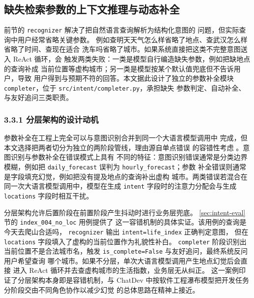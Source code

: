 ﻿%

\subsection{缺失检索参数的上下文推理与动态补全}
\label{sec:param-completion}

前节的 \texttt{recognizer} 解决了把自然语言查询解析为结构化意图的
问题，但实际查询中用户经常省略关键参数。
例如查明天天气怎么样省略了地点、查武汉怎么样省略了时间、查现在适合
洗车吗省略了城市。如果系统直接把这类不完整意图送入 ReAct 循环，会
触发两类失败：一类是模型自行编造缺失参数，例如把缺地点的查询补成
当前位置等虚构城市；另一类是模型按某个默认值兜底但不告诉用户，导致
用户得到与预期不符的回答。本文据此设计了独立的参数补全模块
\texttt{completer}，位于 \texttt{src/\bk{}intent/\bk{}completer.\bk{}py}，承担缺失
参数判定、自动补全、与友好追问三类职责。

\subsubsection*{3.3.1 \quad 分层架构的设计动机}

参数补全在工程上完全可以与意图识别合并到同一个大语言模型调用中
完成，但本文选择把两者切分为独立的两阶段管线，理由源自单点错误
的容错性考虑 \cite{ref10}。意图识别与参数补全在错误模式上具有
不同的特征：意图识别错误通常是分类边界模糊，例如把
\texttt{daily\_\bk{}forecast} 误判为 \texttt{hourly\_\bk{}forecast}；参数
补全错误则通常是字段填充幻觉，例如把没有提及地点的查询补出虚构
城市。两类错误若混合在同一次大语言模型调用中，模型在生成
\texttt{intent} 字段时的注意力分配会与生成 \texttt{locations}
字段时相互干扰。

分层架构允许后置阶段在前置阶段产生抖动时进行业务层兜底。
\ref{sec:intent-eval} 节的 \texttt{index\_\bk{}004\_\bk{}no\_\bk{}loc} 用例提供了
这一容错机制的具体实证。该用例的查询是今天去爬山合适吗，
\texttt{recognizer} 输出 \texttt{intent=\bk{}life\_\bk{}index} 正确判定意图，
但在 \texttt{locations} 字段填入了虚构的当前位置作为礼貌性补白。
\texttt{completer} 阶段识别出当前位置不是合法城市名，触发
\texttt{is\_\bk{}complete=\bk{}False} 与友好追问，最终系统反问用户希望查询
哪个城市。如果不分层，单次大语言模型调用产生地点幻觉后会直接
进入 ReAct 循环并去查虚构城市的生活指数，业务层无从纠正。
这一案例印证了分层架构本身即是容错机制，与 ChatDev \cite{ref29}
中按软件工程瀑布模型把开发任务分阶段交由不同角色协作以减少幻觉
的总体思路在精神上接近。

